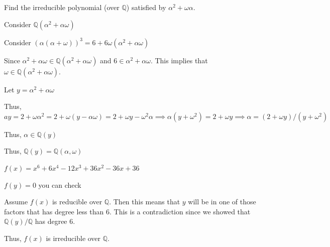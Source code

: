 \documentclass[12pt, letterpaper]{article}
\newcommand{\Q}{\mathbb{Q}}
\begin{document}
\begin{subproblem}{}
    Find the irreducible polynomial (over $\Q$) satisfied by $\alpha^2 +
\omega \alpha $.
\end{subproblem}
\begin{problemproof}
    Consider $\Q(\alpha^2+\alpha\omega)$

    Consider $(\alpha(\alpha+\omega))^3=6+6\omega(\alpha^2+\alpha\omega)$

    Since $\alpha^2+\alpha\omega \in \Q(\alpha^2+\alpha\omega)$ and $6 \in \alpha^2+\alpha\omega$. This implies that $\omega \in \Q(\alpha^2+\alpha\omega)$.

    Let $y=\alpha^2+\alpha\omega$

    Thus, $ay=2+\omega\alpha^2=2+\omega(y-\alpha\omega)=2+\omega y-\omega^2\alpha \implies \alpha(y+\omega^2)=2+\omega y \implies \alpha=(2+\omega y)/(y+\omega^2)$

    Thus, $\alpha \in \Q(y)$

    Thus, $\Q(y)=\Q(\alpha,\omega)$

    $f(x)=x^6+6x^4-12x^3+36x^2-36x+36$

    $f(y)=0$ you can check

    Assume $f(x)$ is reducible over $\Q$. Then this means that $y$ will be in one of those factors that has degree less than 6. This is a contradiction since we showed that $\Q(y)/\Q$ has degree 6.

    Thus, $f(x)$ is irreducible over $\Q$.
\end{problemproof}
\end{document}
